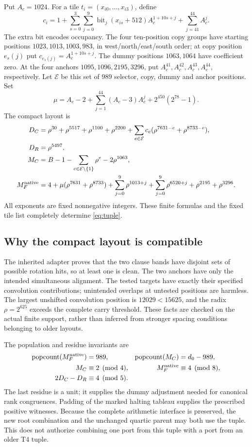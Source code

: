 Put $A_c=1024$. For a tile $t_i=(x_{i0},\ldots,x_{i3})$, define
\[
 c_i=1+\sum_{s=0}^3\sum_{j=0}^9
       \operatorname{bit}_j(x_{is}+512)A_c^{1+10s+j}
           +\sum_{j=41}^{44}A_c^j.
\]
The extra bit encodes occupancy. The four ten-position copy groups have
starting positions $1023,1013,1003,983$, in west/north/east/south order;
at copy position $e_s(j)$ put $c_{e_s(j)}=A_c^{1+10s+j}$.
The dummy positions $1063,1064$ have coefficient zero. At the four anchors
$1095,1096,2195,3296$, put $A_c^{41},A_c^{42},A_c^{43},A_c^{44}$,
respectively. Let $\mathcal E$ be this set of 989 selector, copy, dummy
and anchor positions. Set
\[
 \mu=A_c-2+\sum_{j=1}^{44}(A_c-3)A_c^j
                      +2^{450}(2^{78}-1).
\]
The compact layout is
\begin{align*}
 D_C={}&\rho^{30}+\rho^{5517}+\rho^{1100}+\rho^{2200}
       +\sum_{e\in\mathcal E}c_e(\rho^{7631-e}+\rho^{8733-e}),\\
 D_R={}&\rho^{5497},\\
 M_C={}&B-1-\sum_{e\in\mathcal E\setminus\{1\}}\rho^e
                                     -2\rho^{1063},\\
 M_F^{\rm native}={}&4+\mu(\rho^{7631}+\rho^{8733})
       +\sum_{j=0}^{9}\rho^{1013+j}
       +\sum_{j=0}^{9}\rho^{6520+j}+\rho^{2195}+\rho^{3296}.
\end{align*}
All exponents are fixed nonnegative integers. These finite formulas and the
fixed tile list completely determine \eqref{eq:tuple}.

\subsection{Why the compact layout is compatible}
The inherited adapter proves that the two clause bands have disjoint sets
of possible rotation hits, so at least one is clean. The two anchors have
only the intended simultaneous alignment. The tested targets have exactly
their specified convolution contributions; unintended overlaps at untested
positions are harmless. The largest unshifted convolution position is
$12029<15625$, and the radix $\rho=2^{625}$ exceeds the complete carry
threshold. These facts are checked on the actual finite support, rather
than inferred from stronger spacing conditions belonging to older layouts.

The population and residue invariants are
\begin{align*}
 \operatorname{popcount}(M_F^{\rm native})&=989,&
 \operatorname{popcount}(M_C)&=d_0-989,\\
 M_C&\equiv2\pmod4,&M_F^{\rm native}&\equiv4\pmod8,\\
 2D_C-D_R&\equiv4\pmod5.
\end{align*}
The last residue is a unit; it supplies the dummy adjustment needed for
canonical rank congruences. Padding of the marked halting tableau supplies
the prescribed positive witnesses. Because the complete arithmetic
interface is preserved, the new root combination and the unchanged
quartic parent may both use the tuple. This does not authorize combining
one port from this tuple with a port from an older T4 tuple.

